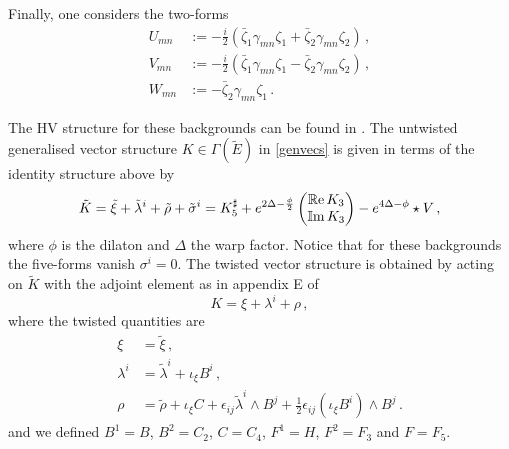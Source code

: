 \documentclass[debug]{phd}
\begin{document}
%
Finally, one considers the two-forms
%
\begin{equation} 
\label{IIB2formsbil}
	\begin{aligned}
		U_{mn} &:= -\tfrac{i}{2}\left(\bar{\zeta}_1\gamma_{mn}\zeta_1 + \bar{\zeta}_2\gamma_{mn}\zeta_2\right)\, , \\
		V_{mn} &:= -\tfrac{i}{2}\left(\bar{\zeta}_1\gamma_{mn}\zeta_1 - \bar{\zeta}_2\gamma_{mn}\zeta_2\right)\, , \\
		W_{mn} &:= -\bar{\zeta}_2\gamma_{mn}\zeta_1\, .
	\end{aligned}
\end{equation} 
%

The HV structure for these backgrounds can be found in \cite{AshmoreESE, Grana_Ntokos}. 
The untwisted generalised vector structure 
$K \in \Gamma(\tilde{E})$ in \eqref{genvecs} is given in terms of the identity structure above by 
%
	\begin{equation} 
	\label{eq:K_tilde_IIB}
		\begin{aligned}
			\tilde{K}= \tilde{\xi} + \tilde{\lambda}^i +\tilde{\rho} + \tilde{\sigma}^i = K_5^{\sharp} +e^{2\Delta - \frac{\phi}{2} } \begin{pmatrix} \operatorname{\mathbb{R}e} K_3 \\ \operatorname{\mathbb{I}m} K_3 \end{pmatrix} - e^{4\Delta - \phi} \star V \, ,
		\end{aligned}
	\end{equation} 
%
where $\phi$ is the dilaton and $\Delta$ the warp factor.
Notice that for these backgrounds the five-forms vanish $\sigma^i =0$. 
The twisted vector structure is obtained by acting on $\tilde K$ with the adjoint element as in appendix E of~\cite{AshmoreECY}
%	
	\begin{equation} 
	\label{eq:IIB_twisted_explicit}
	K = \xi + \lambda^i + \rho \, ,
	\end{equation} 
%
where the twisted quantities are~\cite{AshmoreESE,AshmoreECY}
%
	\begin{subequations}
	\label{IIbtwist}
		\begin{align}
			\xi &= \tilde{\xi}\, , \label{IIbtwistv} \\[1mm]
			\lambda^i & = \tilde{\lambda}^i + \iota_{\xi}B^i\, , \label{IIbtwist1} \\[1mm]
			\rho & = \tilde{\rho} + \iota_\xi C + \epsilon_{ij}\tilde{\lambda}^i \wedge B^j + \tfrac{1}{2}\epsilon_{ij}\left( \iota_\xi B^i \right)\wedge B^j\, . \label{IIbtwist3}%
		\end{align}
	\end{subequations}
%
and we defined $B^1 = B$, $B^2 = C_2$, $C = C_4$, $F^1= H$, $F^2 = F_3$ and $F=F_5$.
\end{document}
